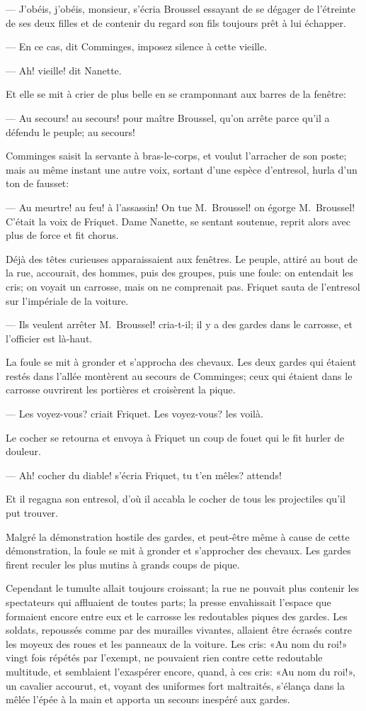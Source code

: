 — J'obéis, j'obéis, monsieur, s'écria Broussel essayant de se dégager de l'étreinte de ses deux filles et de contenir du regard son fils toujours prêt à lui échapper.

— En ce cas, dit Comminges, imposez silence à cette vieille.

— Ah! vieille! dit Nanette.

Et elle se mit à crier de plus belle en se cramponnant aux barres de la fenêtre:

— Au secours! au secours! pour maître Broussel, qu'on arrête parce qu'il a défendu le peuple; au secours!

Comminges saisit la servante à bras-le-corps, et voulut l'arracher de son poste; mais au même instant une autre voix, sortant d'une espèce d'entresol, hurla d'un ton de fausset:

— Au meurtre! au feu! à l'assassin! On tue M.~Broussel! on égorge M.~Broussel!
C'était la voix de Friquet. Dame Nanette, se sentant soutenue, reprit alors avec plus de force et fit chorus.

Déjà des têtes curieuses apparaissaient aux fenêtres. Le peuple, attiré au bout de la rue, accourait, des hommes, puis des groupes, puis une foule: on entendait les cris; on voyait un carrosse, mais on ne comprenait pas. Friquet sauta de l'entresol sur l'impériale de la voiture.

— Ils veulent arrêter M.~Broussel! cria-t-il; il y a des gardes dans le carrosse, et l'officier est là-haut.

La foule se mit à gronder et s'approcha des chevaux. Les deux gardes qui étaient restés dans l'allée montèrent au secours de Comminges; ceux qui étaient dans le carrosse ouvrirent les portières et croisèrent la pique.

— Les voyez-vous? criait Friquet. Les voyez-vous? les voilà.

Le cocher se retourna et envoya à Friquet un coup de fouet qui le fit hurler de douleur.

— Ah! cocher du diable! s'écria Friquet, tu t'en mêles? attends!

Et il regagna son entresol, d'où il accabla le cocher de tous les projectiles qu'il put trouver.

Malgré la démonstration hostile des gardes, et peut-être même à cause de cette démonstration, la foule se mit à gronder et s'approcher des chevaux. Les gardes firent reculer les plus mutins à grands coups de pique.

Cependant le tumulte allait toujours croissant; la rue ne pouvait plus contenir les spectateurs qui affluaient de toutes parts; la presse envahissait l'espace que formaient encore entre eux et le carrosse les redoutables piques des gardes. Les soldats, repoussés comme par des murailles vivantes, allaient être écrasés contre les moyeux des roues et les panneaux de la voiture. Les cris: «Au nom du roi!» vingt fois répétés par l'exempt, ne pouvaient rien contre cette redoutable multitude, et semblaient l'exaspérer encore, quand, à ces cris: «Au nom du roi!», un cavalier accourut, et, voyant des uniformes fort maltraités, s'élança dans la mêlée l'épée à la main et apporta un secours inespéré aux gardes.

